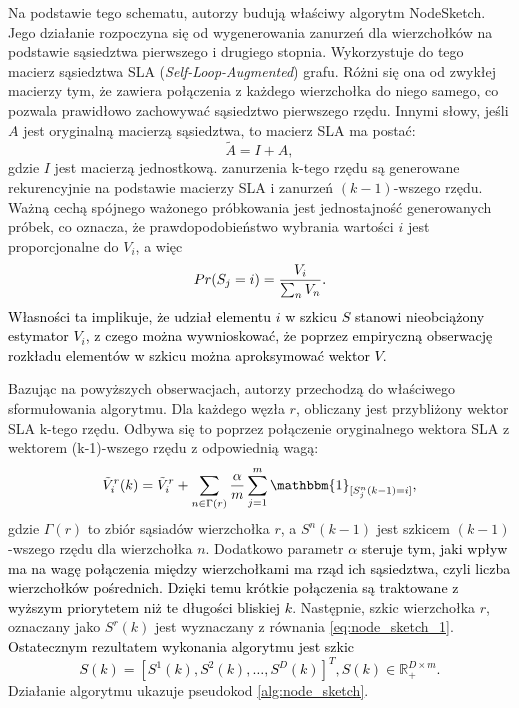             Na podstawie tego schematu, autorzy budują właściwy algorytm NodeSketch. Jego działanie rozpoczyna się od wygenerowania zanurzeń dla wierzchołków na podstawie sąsiedztwa pierwszego i drugiego stopnia. Wykorzystuje do tego macierz sąsiedztwa SLA (\textit{Self-Loop-Augmented}) grafu. Różni się ona od zwykłej macierzy tym, że zawiera połączenia z każdego wierzchołka do niego samego, co pozwala prawidłowo zachowywać sąsiedztwo pierwszego rzędu. Innymi słowy, jeśli $A$ jest oryginalną macierzą sąsiedztwa, to macierz SLA ma postać:
            \[
                \tilde{A} = I + A,
            \]
            gdzie $I$ jest macierzą jednostkową. zanurzenia k-tego rzędu są generowane rekurencyjnie na podstawie macierzy SLA i zanurzeń $(k - 1)$-wszego rzędu. Ważną cechą spójnego ważonego próbkowania jest jednostajność generowanych próbek, co oznacza, że prawdopodobieństwo wybrania wartości $i$ jest proporcjonalne do $V_i$, a więc 
            \[
                Pr(S_j = i) = \frac{V_i}{\color{black} \sum_{n} V_n}.  
            \] \textcolor{black}{Własności ta implikuje, że udział elementu $i$ w szkicu $S$ stanowi nieobciążony estymator $V_i$, z czego można wywnioskować, że poprzez empiryczną obserwację rozkładu elementów w szkicu można aproksymować wektor $V$.} 
            
            Bazując na powyższych obserwacjach, autorzy przechodzą do właściwego sformułowania algorytmu. Dla każdego węzła $r$, obliczany jest przybliżony wektor SLA k-tego rzędu. Odbywa się to poprzez połączenie oryginalnego wektora SLA z wektorem (k-1)-wszego rzędu z odpowiednią wagą:
            \begin{equation} \label{eq:node_sketch_3}  
                \tilde{V}_{i}^{r}(k) = \tilde{V}_{i}^{r} + \sum\limits_{n \in 	\Gamma(r)} \frac{\alpha}{m} \sum\limits_{j = 1}^{m} \mathbbm{1}_{[S_{j}^{n}(k - 1) = i]},
            \end{equation}
            gdzie $\Gamma(r)$ to zbiór sąsiadów wierzchołka $r$, a $S^{n}(k-1)$ jest szkicem $(k-1)$-wszego rzędu dla wierzchołka $n$. Dodatkowo parametr $\alpha$ \textcolor{black}{steruje tym, jaki wpływ ma na wagę połączenia między wierzchołkami ma rząd ich sąsiedztwa, czyli liczba wierzchołków pośrednich. Dzięki temu krótkie połączenia są traktowane z wyższym priorytetem niż te długości bliskiej $k$}. Następnie, szkic wierzchołka $r$, oznaczany jako $S^{r}(k)$ jest wyznaczany z równania \ref{eq:node_sketch_1}. \textcolor{black}{Ostatecznym rezultatem wykonania algorytmu jest szkic 
            \[
                S(k) = [S^1(k), S^2(k), \dots, S^{D}(k)]^{T}, S(k) \in \mathbb{R}_{+}^{D \times m}.
            \]} 
            Działanie algorytmu ukazuje pseudokod \ref{alg:node_sketch}.

